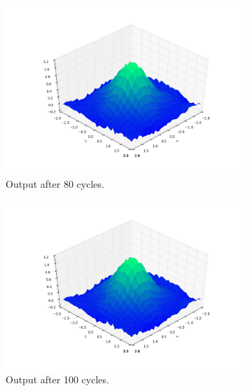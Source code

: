 \documentclass[a4paper,10pt]{article}
\numberwithin{equation}{section} %
\numberwithin{figure}{section} %
\numberwithin{table}{section} %
\theoremstyle{mytheor}
\begin{document}
\begin{enumerate}
\begin{figure}[h!]
\begin{subfigure}[b]{0.45\textwidth}
				\includegraphics[width=\textwidth]{ex2_4_80.png}\vspace{-0.5cm}
				\caption{Output after 80 cycles.}
			\end{subfigure}
			\begin{subfigure}[b]{0.45\textwidth}
				\includegraphics[width=\textwidth]{ex2_4_100.png}\vspace{-0.5cm}
				\caption{Output after 100 cycles.}
			\end{subfigure}
			\begin{subfigure}[b]{0.45\textwidth}

\end{subfigure}
\end{figure}
\end{enumerate}
\end{document}
